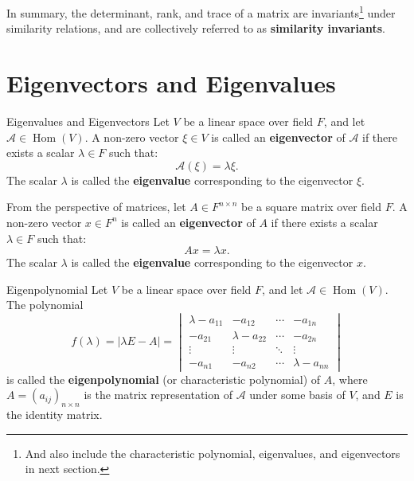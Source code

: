 \documentclass[11pt]{../../TexTemplate/elegantbook} %
\begin{document}
\vspace{0.7cm}
In summary, the determinant, rank, and trace of a matrix are invariants\footnote{
    And also include the characteristic polynomial, eigenvalues, and eigenvectors in next section.
} under similarity relations, 
and are collectively referred to as \textbf{similarity invariants}.


\section{Eigenvectors and Eigenvalues}
\begin{definition}{Eigenvalues and Eigenvectors}
    Let \( V \) be a linear space over field \( F \), 
    and let \( \mathcal{A}\in \operatorname{Hom}(V) \).
    A non-zero vector \( \xi \in V \) is called an \textbf{eigenvector} of \( \mathcal{A} \)
    if there exists a scalar \( \lambda \in F \) such that:
    \[
    \mathcal{A}(\xi) = \lambda \xi.
    \]
    The scalar \( \lambda \) is called the \textbf{eigenvalue} corresponding to the eigenvector \( \xi \).
    
    From the perspective of matrices,
    let \( A \in F^{n \times n} \) be a square matrix over field \( F \).
    A non-zero vector \( x \in F^n \) is called an \textbf{eigenvector} of \( A \)
    if there exists a scalar \( \lambda \in F \) such that:
    \[
    A x = \lambda x.
    \]
    The scalar \( \lambda \) is called the \textbf{eigenvalue} corresponding to the eigenvector \( x \).
\end{definition}

\begin{definition}{Eigenpolynomial}
    Let \( V \) be a linear space over field \( F \), 
    and let \( \mathcal{A}\in \operatorname{Hom}(V) \).
    The polynomial
    \[
    f(\lambda) = |\lambda E - A| = \begin{vmatrix}
        \lambda - a_{11} & -a_{12} & \cdots & -a_{1n} \\
        -a_{21} & \lambda - a_{22} & \cdots & -a_{2n} \\
        \vdots & \vdots & \ddots & \vdots \\
        -a_{n1} & -a_{n2} & \cdots & \lambda - a_{nn}
    \end{vmatrix}
    \]
    is called the \textbf{eigenpolynomial} (or characteristic polynomial) of \( A \),
    where \( A = (a_{ij})_{n\times n} \) is the matrix representation of \( \mathcal{A} \)
    under some basis of \( V \), and \( E \) is the identity matrix.
\end{definition}
\end{document}
